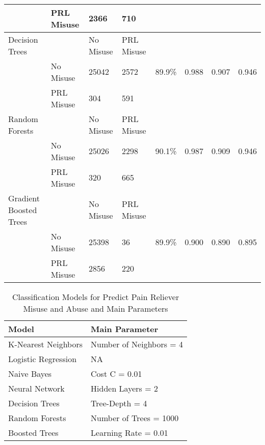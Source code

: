\\\documentclass[sigconf]{acmart}
\begin{document}
\begin{table*}[ht]
\begin{tabular}{llllllll}
     & PRL Misuse & 2366 & 710 &  &  &  & \\
    \midrule
    Decision Trees & & No Misuse & PRL Misuse &  &  &  & \\
     & No Misuse & 25042 & 2572 & 89.9\% & 0.988 & 0.907 & 0.946 \\
     & PRL Misuse & 304 & 591 &  &  &  & \\
    \midrule
    Random Forests & & No Misuse & PRL Misuse &  &  &  & \\
     & No Misuse & 25026 & 2298 & 90.1\% & 0.987 & 0.909 & 0.946 \\
     & PRL Misuse & 320 & 665 &  &  &  & \\
    \midrule
    Gradient Boosted Trees & & No Misuse & PRL Misuse &  &  &  & \\
     & No Misuse & 25398 & 36 & 89.9\% & 0.900 & 0.890 & 0.895 \\
     & PRL Misuse & 2856 & 220 &  &  &  & \\
    \bottomrule
  \end{tabular}
\end{table*}


\begin{table}
  \caption{Classification Models for Predict Pain Reliever Misuse 
  and Abuse and Main Parameters}
  \label{tab:freq}
  \begin{tabular}{ll}
    \toprule
    Model & Main Parameter \\
    \midrule
    K-Nearest Neighbors & Number of Neighbors = 4 \\
    Logistic Regression & NA \\
    Naive Bayes & Cost C = 0.01 \\
    Neural Network & Hidden Layers = 2 \\
    Decision Trees & Tree-Depth = 4 \\ 
    Random Forests & Number of Trees = 1000 \\
    Boosted Trees & Learning Rate = 0.01 \\ 
    \bottomrule
  \end{tabular}
\end{table}


\end{document}
